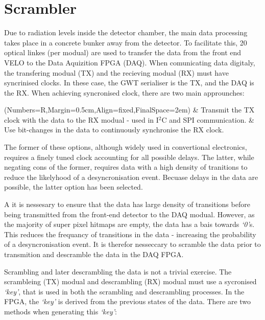 \section{Scrambler}
\label{sec:scrambling_algorithms}

	Due to radiation levels inside the detector chamber, the main data processing takes place in a concrete bunker away from the detector.
	To facilitate this, 20 optical linkes (per modual) are used to transfer the data from the front end VELO to the Data Aquizition FPGA (DAQ).
	When comunicating data digitaly, the transfering modual (TX) and the recieving modual (RX) must have syncrinised clocks.
	In these case, the GWT serialiser is the TX, and the DAQ is the RX.
	When achieving syncronised clock, there are two main approunches:

	\begin{easylist}
		\ListProperties(Numbers=R,Margin=0.5cm,Align=fixed,FinalSpace=2em)
		& Transmit the TX clock with the data to the RX modual - used in I$^2$C and SPI communication.
		& Use bit-changes in the data to continuously synchronise the RX clock.
	\end{easylist}

	The former of these options, although widely used in convertional electronics, requires a finely tuned clock accounting for all possible delays.
	The latter, while negating cons of the former, requires data with a high density of tranitions to reduce the likelyhood of a desyncronisation event.
	Becuase delays in the data are possible, the latter option has been selected.

	A it is nessesary to ensure that the data has large density of transitions before being transmitted from the front-end detector to the DAQ modual.
	However, as the majority of super pixel hitmaps are empty, the data has a bais towards \textit{`0'}s.
	This reduces the frequancy of transitions in the data - increasing the probability of a desyncronisation event.
	It is therefor nesseccary to scramble the data prior to transmition and descramble the data in the DAQ FPGA.
	\par
	Scrambling and later descrambling the data is not a trivial exercise.
	The scrambleing (TX) modual and descrambling (RX) modual must use a sycronised \textit{`key'}, that is used in both the scrambling and descrambling processes.
	In the FPGA, the \textit{`key'} is derived from the previous states of the data.
	There are two methods when generating this \textit{`key'}:

